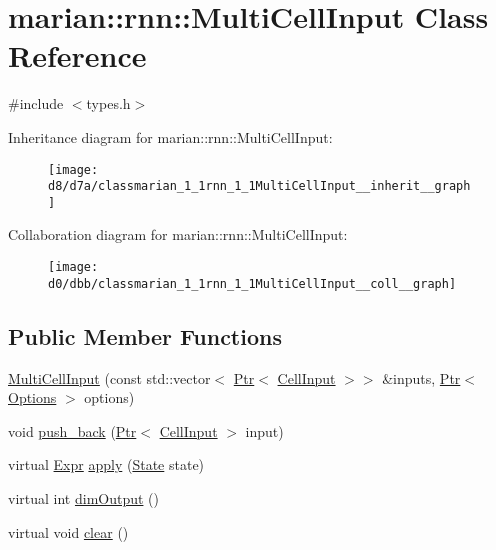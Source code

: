 \hypertarget{classmarian_1_1rnn_1_1MultiCellInput}{}\section{marian\+:\+:rnn\+:\+:Multi\+Cell\+Input Class Reference}
\label{classmarian_1_1rnn_1_1MultiCellInput}


{\ttfamily \#include $<$types.\+h$>$}



Inheritance diagram for marian\+:\+:rnn\+:\+:Multi\+Cell\+Input\+:
\nopagebreak
\begin{figure}[H]
\begin{center}
\leavevmode
\texttt{[image: d8/d7a/classmarian\_1\_1rnn\_1\_1MultiCellInput\_\_inherit\_\_graph]}
\end{center}
\end{figure}


Collaboration diagram for marian\+:\+:rnn\+:\+:Multi\+Cell\+Input\+:
\nopagebreak
\begin{figure}[H]
\begin{center}
\leavevmode
\texttt{[image: d0/dbb/classmarian\_1\_1rnn\_1\_1MultiCellInput\_\_coll\_\_graph]}
\end{center}
\end{figure}
\subsection*{Public Member Functions}
\begin{DoxyCompactItemize}
\item 
\hyperlink{classmarian_1_1rnn_1_1MultiCellInput_aface631182bc9360f9516c2a5b59cb5b}{Multi\+Cell\+Input} (const std\+::vector$<$ \hyperlink{namespacemarian_ad1a373be43a00ef9ce35666145137b08}{Ptr}$<$ \hyperlink{classmarian_1_1rnn_1_1CellInput}{Cell\+Input} $>$$>$ \&inputs, \hyperlink{namespacemarian_ad1a373be43a00ef9ce35666145137b08}{Ptr}$<$ \hyperlink{classmarian_1_1Options}{Options} $>$ options)
\item 
void \hyperlink{classmarian_1_1rnn_1_1MultiCellInput_a099cc1af045103e8ef1be23deb4515e7}{push\+\_\+back} (\hyperlink{namespacemarian_ad1a373be43a00ef9ce35666145137b08}{Ptr}$<$ \hyperlink{classmarian_1_1rnn_1_1CellInput}{Cell\+Input} $>$ input)
\item 
virtual \hyperlink{namespacemarian_a498d8baf75b754011078b890b39c8e12}{Expr} \hyperlink{classmarian_1_1rnn_1_1MultiCellInput_a2ac13f95a42a983a77dfa33c02b62a84}{apply} (\hyperlink{structmarian_1_1rnn_1_1State}{State} state)
\item 
virtual int \hyperlink{classmarian_1_1rnn_1_1MultiCellInput_ad3fac6f8682f6af651147cd045075d4a}{dim\+Output} ()
\item 
virtual void \hyperlink{classmarian_1_1rnn_1_1MultiCellInput_a0ac479a873c47c2817015c26b2ccc213}{clear} ()
\end{DoxyCompactItemize}
